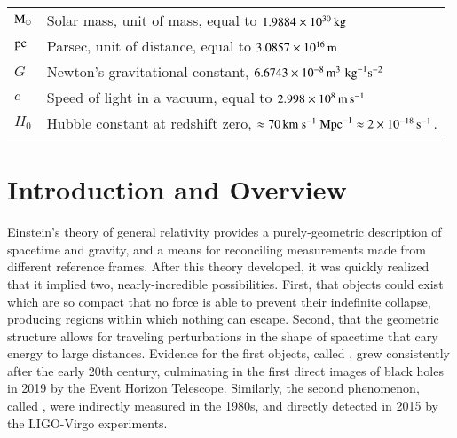 \documentclass[onecolumn,authoryear]{els-mrw}
\begin{document}
    \begin{glossary}
    \begin{tabular}{@{}lp{34pc}@{}}
    $\textrm{M}_{\odot}$ & Solar mass, unit of mass, equal to $1.9884\times\nobreak10^{30} \, \mathrm{kg}$ \\
    $\mathrm{pc}$ & Parsec, unit of distance, equal to $3.0857\times\nobreak10^{16} \, \mathrm{m}$ \\
    $G$ & Newton's gravitational constant, $6.6743\times\nobreak10^{-8} \, \mathrm{m}^3 \, \, \mathrm{kg}^{-1} \mathrm{s}^{-2}$ \\
    $c$ & Speed of light in a vacuum, equal to $2.998\times\nobreak10^{8} \, \mathrm{m} \, \mathrm{s}^{-1}$ \\
    $H_0$ & Hubble constant at redshift zero, $\approx 70 \, \textrm{km}~\textrm{s}^{-1}~\textrm{Mpc}^{-1} \approx 2\times\nobreak10^{-18} \, \mathrm{s}^{-1}$.
    \end{tabular}
    \end{glossary}







\section{Introduction and Overview}\label{sec:intro}

Einstein's theory of general relativity provides a purely-geometric description of spacetime and gravity, and a means for reconciling measurements made from different reference frames.  After this theory developed, it was quickly realized that it implied two, nearly-incredible possibilities.  First, that objects could exist which are so compact that no force is able to prevent their indefinite collapse, producing regions within which nothing can escape.  Second, that the geometric structure allows for traveling perturbations in the shape of spacetime that cary energy to large distances.  Evidence for the first objects, called , grew consistently after the early 20th century, culminating in the first direct images of black holes in 2019 by the Event Horizon Telescope.  Similarly, the second phenomenon, called , were indirectly measured in the 1980s, and directly detected in 2015 by the LIGO-Virgo experiments.
\end{document}
